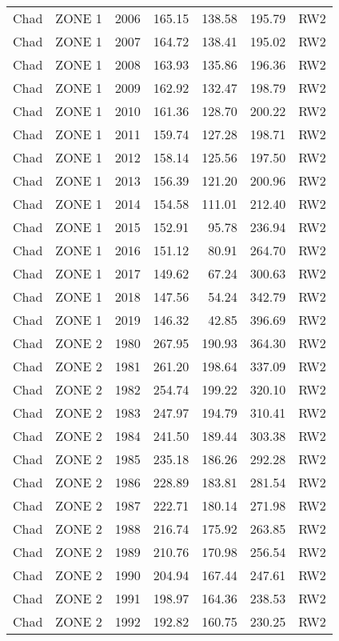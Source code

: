 \begin{longtable}{lllrrrl}
  Chad & ZONE 1 & 2006 & 165.15 & 138.58 & 195.79 & RW2 \\ 
  Chad & ZONE 1 & 2007 & 164.72 & 138.41 & 195.02 & RW2 \\ 
  Chad & ZONE 1 & 2008 & 163.93 & 135.86 & 196.36 & RW2 \\ 
  Chad & ZONE 1 & 2009 & 162.92 & 132.47 & 198.79 & RW2 \\ 
  Chad & ZONE 1 & 2010 & 161.36 & 128.70 & 200.22 & RW2 \\ 
  Chad & ZONE 1 & 2011 & 159.74 & 127.28 & 198.71 & RW2 \\ 
  Chad & ZONE 1 & 2012 & 158.14 & 125.56 & 197.50 & RW2 \\ 
  Chad & ZONE 1 & 2013 & 156.39 & 121.20 & 200.96 & RW2 \\ 
  Chad & ZONE 1 & 2014 & 154.58 & 111.01 & 212.40 & RW2 \\ 
  Chad & ZONE 1 & 2015 & 152.91 & 95.78 & 236.94 & RW2 \\ 
  Chad & ZONE 1 & 2016 & 151.12 & 80.91 & 264.70 & RW2 \\ 
  Chad & ZONE 1 & 2017 & 149.62 & 67.24 & 300.63 & RW2 \\ 
  Chad & ZONE 1 & 2018 & 147.56 & 54.24 & 342.79 & RW2 \\ 
  Chad & ZONE 1 & 2019 & 146.32 & 42.85 & 396.69 & RW2 \\ 
  Chad & ZONE 2 & 1980 & 267.95 & 190.93 & 364.30 & RW2 \\ 
  Chad & ZONE 2 & 1981 & 261.20 & 198.64 & 337.09 & RW2 \\ 
  Chad & ZONE 2 & 1982 & 254.74 & 199.22 & 320.10 & RW2 \\ 
  Chad & ZONE 2 & 1983 & 247.97 & 194.79 & 310.41 & RW2 \\ 
  Chad & ZONE 2 & 1984 & 241.50 & 189.44 & 303.38 & RW2 \\ 
  Chad & ZONE 2 & 1985 & 235.18 & 186.26 & 292.28 & RW2 \\ 
  Chad & ZONE 2 & 1986 & 228.89 & 183.81 & 281.54 & RW2 \\ 
  Chad & ZONE 2 & 1987 & 222.71 & 180.14 & 271.98 & RW2 \\ 
  Chad & ZONE 2 & 1988 & 216.74 & 175.92 & 263.85 & RW2 \\ 
  Chad & ZONE 2 & 1989 & 210.76 & 170.98 & 256.54 & RW2 \\ 
  Chad & ZONE 2 & 1990 & 204.94 & 167.44 & 247.61 & RW2 \\ 
  Chad & ZONE 2 & 1991 & 198.97 & 164.36 & 238.53 & RW2 \\ 
  Chad & ZONE 2 & 1992 & 192.82 & 160.75 & 230.25 & RW2 \\ 

\end{longtable}
